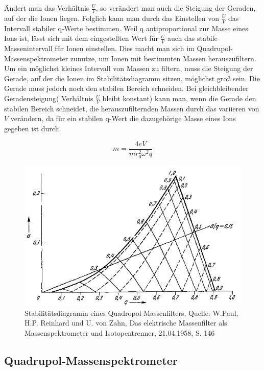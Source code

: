 \documentclass[10pt,a4paper]{article}
\begin{document}
Ändert man das Verhältnis $\frac{U}{V}$, so verändert man auch die Steigung der Geraden, auf der die Ionen liegen. Folglich kann man durch das Einstellen von $\frac{U}{V}$ das Intervall stabiler q-Werte bestimmen. Weil q antiproportional zur Masse eines Ions ist, lässt sich mit dem eingestellten Wert für $\frac{U}{V}$ auch das stabile Massenintervall für Ionen einstellen. Dies macht man sich im Quadrupol-Massenspektrometer zunutze, um Ionen mit bestimmten Massen herauszufiltern. Um ein möglichst kleines Intervall von Massen zu filtern, muss die Steigung der Gerade, auf der die Ionen im Stabilitätsdiagramm sitzen, möglichst groß sein. Die Gerade muss jedoch noch den stabilen Bereich schneiden. Bei gleichbleibender Geradensteigung( Verhältnis $\frac{U}{V}$ bleibt konstant) kann man, wenn die Gerade den stabilen Bereich schneidet, die herauszufilternden Massen durch das variieren von $V$ verändern, da für ein stabilen q-Wert die dazugehörige Masse eines Ions gegeben ist durch

\begin{equation}
	m = \frac{4eV}{mr_0^2\omega^2q}
\end{equation}

\begin{figure}[h]
	\centering
	\includegraphics[scale = 0.8]{stabilitatsdiagramm.png}
	\caption{Stabilitätsdiagramm eines Quadropol-Massenfilters, Quelle: W.Paul, H.P. Reinhard und U. von Zahn, Das elektrische Massenfilter als Massenspektrometer und Isotopentrenner, 21.04.1958, S. 146}
	\label{stabilitatsdiagramm1}
\end{figure}

\subsection{Quadrupol-Massenspektrometer}
\end{document}
